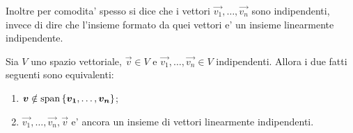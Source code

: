 Inoltre per comodita' spesso si dice che i vettori $\vec{v_1}, \dots, \vec{v_n}$ sono indipendenti, invece di dire che l'insieme formato da quei vettori e' un insieme linearmente indipendente.

\begin{proposition}\label{aggiunto_vettore_indipendente}
    Sia $V$ uno spazio vettoriale, $\vec v \in V$ e $\vec{v_1}, \dots, \vec{v_n} \in V$ indipendenti. Allora i due fatti seguenti sono equivalenti:
    \begin{enumerate}
        \item $\bm{v} \notin \operatorname{span}\left\{\bm{v_1}, \dots, \bm{v_n}\right\}$;
        \item $\vec{v_1}, \dots, \vec{v_n}, \vec v$ e' ancora un insieme di vettori linearmente indipendenti.
    \end{enumerate}
\end{proposition}
